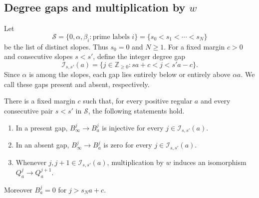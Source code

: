 \subsection{Degree gaps and multiplication by \texorpdfstring{$w$}{w}}

Let
\[
 \mathcal S=\{0,\alpha,\beta_i:\text{prime labels }i\}
           =\{s_0<s_1<\cdots<s_N\}
\]
be the list of distinct slopes.  Thus $s_0=0$ and $N\ge1$.
For a fixed margin $c>0$ and consecutive slopes $s<s'$, define the
integer degree gap
\[
 \mathcal I_{s,s'}(a)
 =\{j\in\mathbb Z_{\ge0}:sa+c<j<s'a-c\}.
\]
Since $\alpha$ is among the slopes, each gap lies entirely below or
entirely above $\alpha a$.  We call these gaps present and absent,
respectively.

\begin{lemma}\label{trans:degree-gaps}
There is a fixed margin $c$ such that, for every positive regular $a$
and every consecutive pair $s<s'$ in $\mathcal S$, the following
statements hold.
\begin{enumerate}
 \item In a present gap, $B_\infty^j\to B_a^j$ is injective for every
       $j\in\mathcal I_{s,s'}(a)$.
 \item In an absent gap, $B_\infty^j\to B_a^j$ is zero for every
       $j\in\mathcal I_{s,s'}(a)$.
 \item Whenever $j,j+1\in\mathcal I_{s,s'}(a)$, multiplication by $w$
       induces an isomorphism $Q_a^j\to Q_a^{j+1}$.
\end{enumerate}
Moreover $B_a^j=0$ for $j>s_Na+c$.
\end{lemma}

